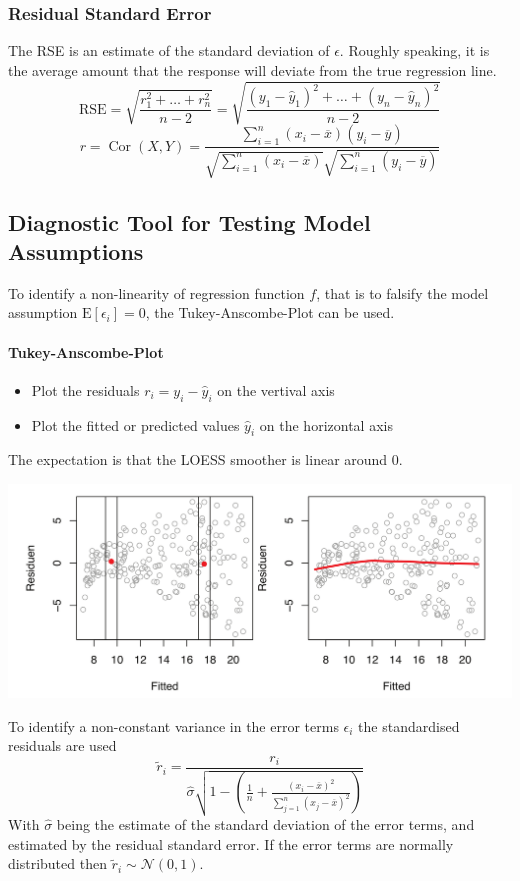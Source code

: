 \documentclass[11pt]{article}
\theoremstyle{definition}
\newcommand*\samplemean[1]{\overline{#1}}
\newcommand*\ev[1]{\mathrel{\text{E}\left[#1\right]}}
\newcommand*\N[1]{\mathcal{N}\left(#1\right)}
\newcommand*\Cor[1]{\mathop{\text{Cor}}\left(#1\right)}
\begin{document}
\subsubsection{Residual Standard Error}
The RSE is an estimate of the standard deviation of $\epsilon$. Roughly speaking, it is the average amount that the response will deviate from the true regression line.
\begin{equation*}
	\text{RSE} = \sqrt{\frac{r_1^2 + \dots + r_n^2}{n-2}} = \sqrt{\frac{(y_1 - \hat{y}_1)^2 + \dots + (y_n - \hat{y}_n)^2}{n-2}}
\end{equation*}
\begin{equation*}
	r = \Cor{X,Y} = \frac{\sum_{i=1}^{n}(x_i - \samplemean{x})(y_i - \samplemean{y})}{\sqrt{\sum_{i=1}^{n} (x_i - \samplemean{x})}\sqrt{\sum_{i=1}^{n} (y_i - \samplemean{y})}}
\end{equation*}

\subsection{Diagnostic Tool for Testing Model Assumptions}
To identify a non-linearity of regression function $f$, that is to falsify the model assumption $\ev{\epsilon_i} = 0$, the Tukey-Anscombe-Plot can be used.\\
\paragraph{Tukey-Anscombe-Plot}
\begin{itemize}
	\item Plot the residuals $r_i = y_i - \hat{y}_i$ on the vertival axis
	\item Plot the fitted or predicted values $\hat{y}_i$ on the horizontal axis
\end{itemize}
The expectation is that the LOESS smoother is linear around 0.
\begin{center}
	\includegraphics[width=0.8\linewidth]{img/LOESS_smoother}
\end{center}
To identify a non-constant variance in the error terms $\epsilon_i$ the standardised residuals are used
\begin{equation*}
	\tilde{r}_i = \frac{r_i}{\hat{\sigma}\sqrt{1 - \left( \frac{1}{n} + \frac{(x_i - \samplemean{x})^2}{\sum_{j=1}^{n}(x_j - \samplemean{x})^2} \right)}}
\end{equation*}
With $\hat{\sigma}$ being the estimate of the standard deviation of the error terms, and estimated by the residual standard error. If the error terms are normally distributed then $\tilde{r}_i \sim \N{0,1}$.
\end{document}
